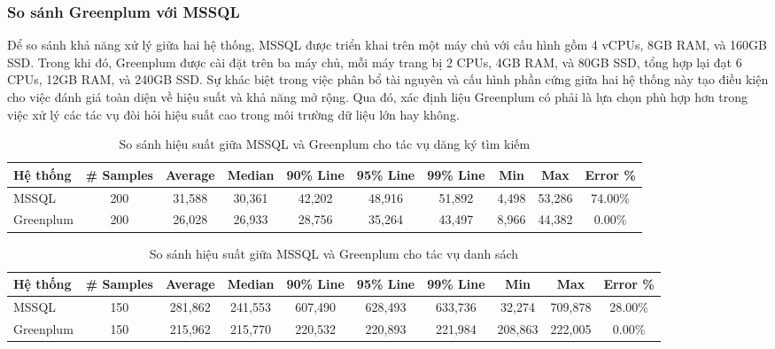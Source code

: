 \subsubsection{So sánh Greenplum với MSSQL}

Để so sánh khả năng xử lý giữa hai hệ thống, MSSQL được triển khai trên một máy chủ với cấu hình gồm 4 vCPUs, 8GB RAM, và 160GB SSD. Trong khi đó, Greenplum được cài đặt trên ba máy chủ, mỗi máy trang bị 2 CPUs, 4GB RAM, và 80GB SSD, tổng hợp lại đạt 6 CPUs, 12GB RAM, và 240GB SSD. Sự khác biệt trong việc phân bổ tài nguyên và cấu hình phần cứng giữa hai hệ thống này tạo điều kiện cho việc đánh giá toàn diện về hiệu suất và khả năng mở rộng. Qua đó, xác định liệu Greenplum có phải là lựa chọn phù hợp hơn trong việc xử lý các tác vụ đòi hỏi hiệu suất cao trong môi trường dữ liệu lớn hay không.



\begin{table}[htbp]
\centering
\renewcommand{\arraystretch}{1.2}
\setlength{\tabcolsep}{4pt} 
\begin{tabular}{|l|c|c|c|c|c|c|c|c|c|}
\hline
\textbf{Hệ thống} & \textbf{\# Samples} & \textbf{Average} & \textbf{Median} & \textbf{90\% Line} & \textbf{95\% Line} & \textbf{99\% Line} & \textbf{Min} & \textbf{Max} & \textbf{Error \%} \\ \hline
MSSQL & 200 & 31,588 & 30,361 & 42,202 & 48,916 & 51,892 & 4,498 & 53,286 & 74.00\% \\ \hline
Greenplum & 200 & 26,028 & 26,933 & 28,756 & 35,264 & 43,497 & 8,966 & 44,382 & 0.00\% \\ \hline
\end{tabular}
\caption{So sánh hiệu suất giữa MSSQL và Greenplum cho tác vụ dăng ký tìm kiếm}
\label{tab:performance_comparison}
\end{table}

\begin{table}[htbp]
\centering
\renewcommand{\arraystretch}{1.2} %
\setlength{\tabcolsep}{3.2pt} %
\begin{tabular}{|l|c|c|c|c|c|c|c|c|c|}
\hline
\textbf{Hệ thống} & \textbf{\# Samples} & \textbf{Average} & \textbf{Median} & \textbf{90\% Line} & \textbf{95\% Line} & \textbf{99\% Line} & \textbf{Min} & \textbf{Max} & \textbf{Error \%} \\ \hline
MSSQL & 150 & 281,862 & 241,553 & 607,490 & 628,493 & 633,736 & 32,274 & 709,878 & 28.00\% \\ \hline
Greenplum & 150 & 215,962 & 215,770 & 220,532 & 220,893 & 221,984 & 208,863 & 222,005 & 0.00\% \\ \hline
\end{tabular}
\caption{So sánh hiệu suất giữa MSSQL và Greenplum cho tác vụ danh sách}
\label{tab:performance_comparison_list}
\end{table}


